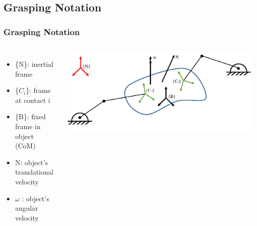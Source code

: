 \documentclass{beamer}
\begin{document}
\subsection{Grasping Notation}
\begin{frame}
\frametitle{Grasping Notation}

\begin{columns}[c] 
\begin{itemize}
\item \{N\}: inertial frame \vspace{0.2cm}
\item \{$C_i$\}: frame at contact i \vspace{0.2cm}
\item \{B\}: fixed frame in object (CoM) \vspace{0.2cm}
\item N: object's translational velocity \vspace{0.2cm}
\item $\omega$ : object's angular velocity \vspace{0.2cm}
\end{itemize}

\centering
 \includegraphics[width=1\textwidth]{figures/GraspingNotationCrop.pdf}
\end{columns}

\end{frame}

\end{document}
